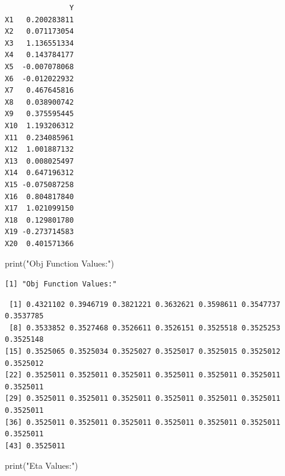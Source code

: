 \documentclass[
  letterpaper,
  DIV=11,
  numbers=noendperiod]{scrartcl}
\newenvironment{Shaded}{\begin{snugshade}}{\end{snugshade}}
\newcommand{\FunctionTok}[1]{\textcolor[rgb]{0.28,0.35,0.67}{#1}}
\newcommand{\NormalTok}[1]{\textcolor[rgb]{0.00,0.23,0.31}{#1}}
\newcommand{\SpecialCharTok}[1]{\textcolor[rgb]{0.37,0.37,0.37}{#1}}
\newcommand{\StringTok}[1]{\textcolor[rgb]{0.13,0.47,0.30}{#1}}
\begin{document}
\begin{Shaded}
\end{Shaded}

\begin{verbatim}
               Y
X1   0.200283811
X2   0.071173054
X3   1.136551334
X4   0.143784177
X5  -0.007078068
X6  -0.012022932
X7   0.467645816
X8   0.038900742
X9   0.375595445
X10  1.193206312
X11  0.234085961
X12  1.001887132
X13  0.008025497
X14  0.647196312
X15 -0.075087258
X16  0.804817840
X17  1.021099150
X18  0.129801780
X19 -0.273714583
X20  0.401571366
\end{verbatim}

\begin{Shaded}
\begin{Highlighting}[]
\FunctionTok{print}\NormalTok{(}\StringTok{"Obj Function Values:"}\NormalTok{)}
\end{Highlighting}
\end{Shaded}

\begin{verbatim}
[1] "Obj Function Values:"
\end{verbatim}

\begin{Shaded}
\end{Shaded}

\begin{verbatim}
 [1] 0.4321102 0.3946719 0.3821221 0.3632621 0.3598611 0.3547737 0.3537785
 [8] 0.3533852 0.3527468 0.3526611 0.3526151 0.3525518 0.3525253 0.3525148
[15] 0.3525065 0.3525034 0.3525027 0.3525017 0.3525015 0.3525012 0.3525012
[22] 0.3525011 0.3525011 0.3525011 0.3525011 0.3525011 0.3525011 0.3525011
[29] 0.3525011 0.3525011 0.3525011 0.3525011 0.3525011 0.3525011 0.3525011
[36] 0.3525011 0.3525011 0.3525011 0.3525011 0.3525011 0.3525011 0.3525011
[43] 0.3525011
\end{verbatim}

\begin{Shaded}
\begin{Highlighting}[]
\FunctionTok{print}\NormalTok{(}\StringTok{"Eta Values:"}\NormalTok{)}
\end{Highlighting}
\end{Shaded}
\end{document}
